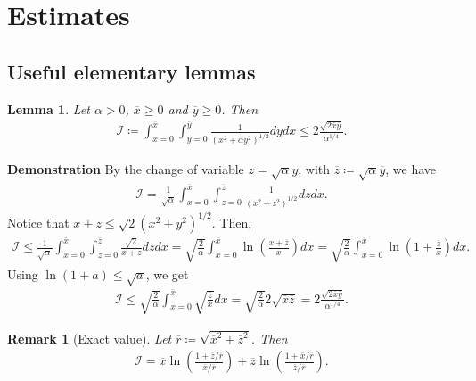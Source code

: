 \documentclass{article}
\newtheorem{remark}{Remark}[section]
\newtheorem{lem}{Lemma}[section]
\numberwithin{equation}{section}
\newcommand{\myproof}[1]{
	\noindent \textbf{Demonstration}
	{\small	#1 \hfill \qedsymbol}
}
\newcommand{\intern}[1]{{\color{RoyalBlue} #1}} %
\begin{document}
\section{Estimates}

\subsection{Useful elementary lemmas}

\begin{lem}\label{lem:int_1surR_rectangle}
	Let $\alpha>0$, $\overline{x}\geqslant0$ and $\overline{y}\geqslant0$. Then
	\begin{align*}
		\mathcal{I} \coloneqq \int_{x=0}^{\overline{x}} \int_{y=0}^{\overline{y}} \frac{1}{\left(x^2+\alpha y^2\right)^{1/2}} dy dx \leqslant 2 \frac{\sqrt{2\overline{x} \overline{y}}}{\alpha^{1/4}}.
	\end{align*}
\end{lem}

\myproof{
	By the change of variable $z=\sqrt{\alpha} y$, with $\overline{z} \coloneqq \sqrt{\alpha} \overline{y}$, we have
	\begin{align*}
		\mathcal{I} = \frac{1}{\sqrt{\alpha}} \int_{x=0}^{\overline{x}} \int_{z=0}^{\overline{z}} \frac{1}{\left(x^2+ z^2\right)^{1/2}} dz dx.
	\end{align*}
	Notice that $x+z \leqslant \sqrt{2} \left(x^2 + y^2\right)^{1/2}$. Then, 
	\begin{align*}
		\mathcal{I} 
		\leqslant \frac{1}{\sqrt{\alpha}} \int_{x=0}^{\overline{x}} \int_{z=0}^{\overline{z}} \frac{\sqrt{2}}{x+z} dz dx 
		= \sqrt{\frac{2}{\alpha}} \int_{x=0}^{\overline{x}} \ln\left(\frac{x+\overline{z}}{x}\right) dx
		= \sqrt{\frac{2}{\alpha}} \int_{x=0}^{\overline{x}} \ln\left(1 + \frac{\overline{z}}{x}\right) dx.
	\end{align*}
	Using $\ln\left(1+a\right) \leqslant \sqrt{a}$, we get
	\begin{align*}
		\mathcal{I} 
		\leqslant \sqrt{\frac{2}{\alpha}} \int_{x=0}^{\overline{x}} \sqrt{\frac{\overline{z}}{x}} dx 
		= \sqrt{\frac{2}{\alpha}} 2 \sqrt{\overline{x} \overline{z}}
		= 2 \frac{\sqrt{2 \overline{x} \overline{y}}}{\alpha^{1/4}}.
	\end{align*}
}

\intern{
\begin{remark}[Exact value]
	Let $\overline{r} \coloneqq \sqrt{\overline{x}^2 + \overline{z}^2}$. Then 
	\begin{align*}
		\mathcal{I} = \overline{x} \ln\left(\frac{1 + \overline{z}/\overline{r}}{\overline{x}/\overline{r}}\right) + \overline{z} \ln\left(\frac{1 + \overline{x}/\overline{r}}{\overline{z}/\overline{r}}\right).
	\end{align*}
\end{remark}
}
\end{document}
